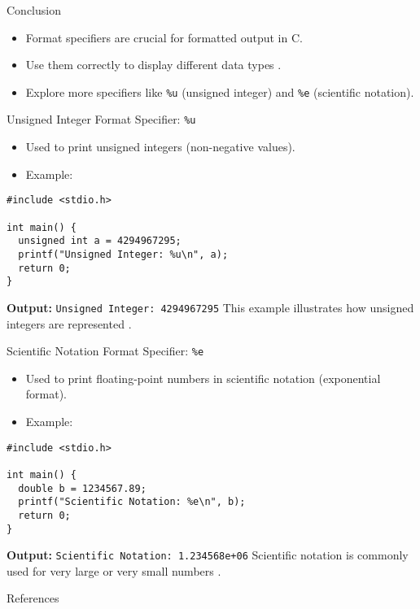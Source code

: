 \documentclass{beamer}
\begin{document}
\begin{frame}{Conclusion}
  \begin{itemize}
    \item Format specifiers are crucial for formatted output in C.
    \item Use them correctly to display different data types \citep{kernighan1988c, knuth1973art}.
    \item Explore more specifiers like \texttt{\%u} (unsigned integer) and \texttt{\%e} (scientific notation).
  \end{itemize}
\end{frame}


\begin{frame}[fragile]{Unsigned Integer Format Specifier: \texttt{\%u}}
  \begin{itemize}
    \item Used to print unsigned integers (non-negative values).
    \item Example:
  \end{itemize}
  \begin{lstlisting}
#include <stdio.h>

int main() {
  unsigned int a = 4294967295;
  printf("Unsigned Integer: %u\n", a);
  return 0;
}
  \end{lstlisting}
  \textbf{Output:} \texttt{Unsigned Integer: 4294967295}
  \vskip 0.5cm
  \footnotesize{This example illustrates how unsigned integers are represented \citep{prata2004c}.}
\end{frame}

\begin{frame}[fragile]{Scientific Notation Format Specifier: \texttt{\%e}}
  \begin{itemize}
    \item Used to print floating-point numbers in scientific notation (exponential format).
    \item Example:
  \end{itemize}
  \begin{lstlisting}
#include <stdio.h>

int main() {
  double b = 1234567.89;
  printf("Scientific Notation: %e\n", b);
  return 0;
}
  \end{lstlisting}
  \textbf{Output:} \texttt{Scientific Notation: 1.234568e+06}
  \vskip 0.5cm
  \footnotesize{Scientific notation is commonly used for very large or very small numbers \citep{knuth1973art}.}
\end{frame}


\begin{frame}[allowframebreaks]{References}
  \printbibliography
\end{frame}
\end{document}
